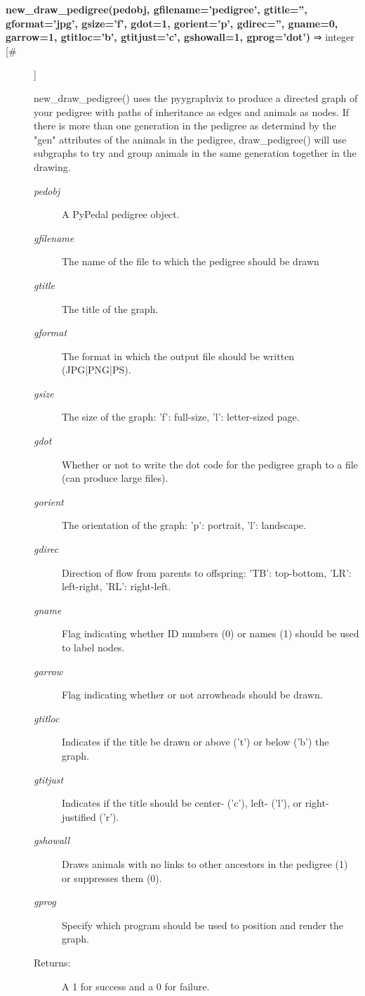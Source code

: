 \documentclass{article}
\begin{document}
\begin{description}
\item[\textbf{new\_draw\_pedigree(pedobj, gfilename='pedigree', gtitle='', gformat='jpg', gsize='f', gdot=1, gorient='p', gdirec='', gname=0, garrow=1, gtitloc='b', gtitjust='c', gshowall=1, gprog='dot')} ⇒ integer [\#]
]
\par new\_draw\_pedigree() uses the pyygraphviz to produce a directed graph of your
pedigree with paths of inheritance as edges and animals as nodes.  If there
is more than one generation in the pedigree as determind by the "gen"
attributes of the animals in the pedigree, draw\_pedigree() will use subgraphs
to try and group animals in the same generation together in the drawing.
\begin{description}
\item[\textit{pedobj}
]
A PyPedal pedigree object.
\item[\textit{gfilename}
]
The name of the file to which the pedigree should be drawn
\item[\textit{gtitle}
]
The title of the graph.
\item[\textit{gformat}
]
The format in which the output file should be written  (JPG|PNG|PS).
\item[\textit{gsize}
]
The size of the graph: 'f': full-size, 'l': letter-sized page.
\item[\textit{gdot}
]
Whether or not to write the dot code for the pedigree graph to a file (can produce large files).
\item[\textit{gorient}
]
The orientation of the graph: 'p': portrait, 'l': landscape.
\item[\textit{gdirec}
]
Direction of flow from parents to offspring: 'TB': top-bottom, 'LR': left-right, 'RL': right-left.
\item[\textit{gname}
]
Flag indicating whether ID numbers (0) or names (1) should be used to label nodes.
\item[\textit{garrow}
]
Flag indicating whether or not arrowheads should be drawn.
\item[\textit{gtitloc}
]
Indicates if the title be drawn or above ('t') or below ('b') the graph.
\item[\textit{gtitjust}
]
Indicates if the title should be center- ('c'), left- ('l'), or right-justified ('r').
\item[\textit{gshowall}
]
Draws animals with no links to other ancestors in the pedigree (1) or suppresses them (0).
\item[\textit{gprog}
]
Specify which program should be used to position and render the graph.
\item[Returns:
]
A 1 for success and a 0 for failure.
\end{description}\\


\end{description}
\end{document}
